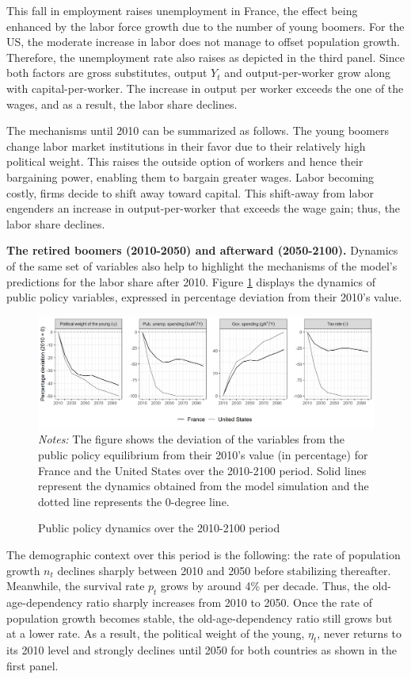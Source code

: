 This fall in employment raises unemployment in France, the effect being enhanced by the labor force growth due to the number of young boomers. For the US, the moderate increase in labor does not manage to offset population growth. Therefore, the unemployment rate also raises as depicted in the third panel. Since both factors are gross substitutes, output $Y_t$ and output-per-worker grow along with capital-per-worker. The increase in output per worker exceeds the one of the wages, and as a result, the labor share declines.

The mechanisms until 2010 can be summarized as follows. The young boomers change labor market institutions in their favor due to their relatively high political weight. This raises the outside option of workers and hence their bargaining power, enabling them to bargain greater wages. Labor becoming costly, firms decide to shift away toward capital. This shift-away from labor engenders an increase in output-per-worker that exceeds the wage gain; thus, the labor share declines. 

\textbf{The retired boomers (2010-2050) and afterward (2050-2100).} Dynamics of the same set of variables also help to highlight the mechanisms of the model's predictions for the labor share after 2010.
Figure \ref{chap1-fig:quant-bench-dev1000-pub} displays the dynamics of public policy variables, expressed in percentage deviation from their 2010's value.
\begin{figure}[!tb]
	\centering
	\caption{Public policy dynamics over the 2010-2100 period} \label{chap1-fig:quant-bench-dev1000-pub}
	\includegraphics[width=1\linewidth]{chap1/graphic/quant-bench-dev1000-pub.png}
	\vspace{-3em}
	\justify\singlespacing\footnotesize\textit{Notes:} The figure shows the deviation of the variables from the public policy equilibrium from their 2010's value (in percentage) for France and the United States over the 2010-2100 period. Solid lines represent the dynamics obtained from the model simulation and the dotted line represents the 0-degree line.
\end{figure}
The demographic context over this period is the following: the rate of population growth $n_t$ declines sharply between 2010 and 2050 before stabilizing thereafter. Meanwhile, the survival rate $p_t$ grows by around 4\% per decade. Thus, the old-age-dependency ratio sharply increases from 2010 to 2050. Once the rate of population growth becomes stable, the old-age-dependency ratio still grows but at a lower rate. As a result, the political weight of the young, $\eta_t$, never returns to its 2010 level and strongly declines until 2050 for both countries as shown in the first panel.

